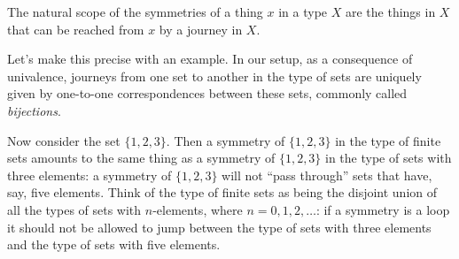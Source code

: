 
The natural scope of the symmetries of a thing $x$ in a type $X$
are the things in $X$ that can be reached from $x$ by a journey in $X$.

Let's make this precise with an example.
In our setup,
as a consequence of univalence, journeys from one set to another
in the type of sets are
uniquely given by one-to-one correspondences between these sets,
commonly called \emph{bijections}.

Now consider the set $\{1,2,3\}$. Then a symmetry of $\{1,2,3\}$ in the type of finite sets amounts to the same thing as a symmetry of $\{1,2,3\}$ in the type of sets with three elements: a symmetry of $\{1,2,3\}$ will not ``pass through'' sets that have, say, five elements. Think of the type of finite sets as being the disjoint union of all the types of sets with $n$-elements, where $n=0,1,2,\dots$: if a symmetry is a loop it should not be allowed to jump between the type of sets with three elements and the type of sets with five elements.

